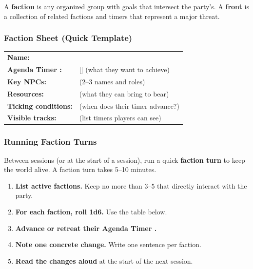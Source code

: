 A \textbf{faction} is any organized group with goals that intersect the party's. A \textbf{front} is a collection of related factions and timers that represent a major threat.

\subsubsection{Faction Sheet (Quick Template)}

\begin{tcolorbox}[colback=white!97!gray, colframe=black!80!gray, title=Faction Template,breakable]
\begin{tabular}{p{4cm}p{10cm}}
\textbf{Name:} & \hrulefill \\
\textbf{Agenda Timer :} & [\hspace{1cm}] (what they want to achieve) \\
\textbf{Key NPCs:} & (2--3 names and roles) \\
\textbf{Resources:} & (what they can bring to bear) \\
\textbf{Ticking conditions:} & (when does their timer advance?) \\
\textbf{Visible tracks:} & (list timers players can see) \\
\end{tabular}
\end{tcolorbox}

\subsubsection{Running Faction Turns}

Between sessions (or at the start of a session), run a quick \textbf{faction turn} to keep the world alive. A faction turn takes 5--10 minutes.

\begin{enumerate}
  \item \textbf{List active factions.} Keep no more than 3--5 that directly interact with the party.
  \item \textbf{For each faction, roll 1d6.} Use the table below.
  \item \textbf{Advance or retreat their Agenda Timer .}
  \item \textbf{Note one concrete change.} Write one sentence per faction.
  \item \textbf{Read the changes aloud} at the start of the next session.
\end{enumerate}


